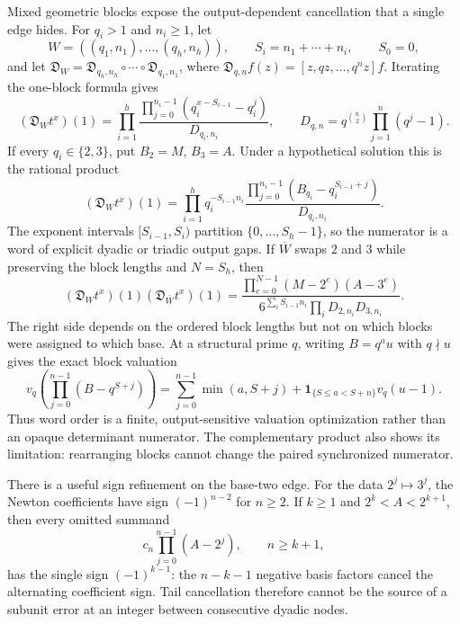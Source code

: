 \documentclass[11pt,oneside]{article}
\theoremstyle{definition}
\theoremstyle{remark}
\begin{document}
Mixed geometric blocks expose the output-dependent cancellation that a single edge hides.
For $q_i>1$ and $n_i\ge1$, let
\[
 W=((q_1,n_1),\ldots,(q_h,n_h)),\qquad
 S_i=n_1+\cdots+n_i,\qquad S_0=0,
\]
and let $\mathfrak D_W=\mathfrak D_{q_h,n_h}\circ\cdots\circ\mathfrak D_{q_1,n_1}$, where
$\mathfrak D_{q,n}f(z)=[z,qz,\ldots,q^nz]f$.  Iterating the one-block formula gives
\begin{equation}
 (\mathfrak D_Wt^x)(1)=
 \prod_{i=1}^h
 \frac{\prod_{j=0}^{n_i-1}(q_i^{x-S_{i-1}}-q_i^j)}
      {D_{q_i,n_i}},
 \qquad
 D_{q,n}=q^{\binom n2}\prod_{j=1}^n(q^j-1).
 \label{arithinterp:eq-mixed-word}
\end{equation}
If every $q_i\in\{2,3\}$, put $B_2=M$, $B_3=A$.  Under a hypothetical solution this is
the rational product
\begin{equation}
 (\mathfrak D_Wt^x)(1)=
 \prod_{i=1}^h q_i^{-S_{i-1}n_i}
 \frac{\prod_{j=0}^{n_i-1}(B_{q_i}-q_i^{S_{i-1}+j})}{D_{q_i,n_i}}.
 \label{arithinterp:eq-mixed-word-output}
\end{equation}
The exponent intervals $[S_{i-1},S_i)$ partition $\{0,\ldots,S_h-1\}$, so the numerator
is a word of explicit dyadic or triadic output gaps.  If $\overline W$ swaps $2$ and $3$
while preserving the block lengths and $N=S_h$, then
\begin{equation}
 (\mathfrak D_Wt^x)(1)(\mathfrak D_{\overline W}t^x)(1)=
 \frac{\prod_{e=0}^{N-1}(M-2^e)(A-3^e)}
 {6^{\sum_iS_{i-1}n_i}\prod_iD_{2,n_i}D_{3,n_i}}.
 \label{arithinterp:eq-complementary-word}
\end{equation}
The right side depends on the ordered block lengths but not on which blocks were assigned to
which base.  At a structural prime $q$, writing $B=q^au$ with $q\nmid u$ gives the exact
block valuation
\begin{equation}
 v_q\!\left(\prod_{j=0}^{n-1}(B-q^{S+j})\right)
 =\sum_{j=0}^{n-1}\min(a,S+j)
 +\mathbf1_{\{S\le a<S+n\}}v_q(u-1).
 \label{arithinterp:eq-shifted-block-valuation}
\end{equation}
Thus word order is a finite, output-sensitive valuation optimization rather than an opaque
determinant numerator.  The complementary product also shows its limitation: rearranging
blocks cannot change the paired synchronized numerator.

There is a useful sign refinement on the base-two edge.  For the data $2^j\mapsto3^j$,
the Newton coefficients have sign $(-1)^{n-2}$ for $n\ge2$.  If $k\ge1$ and
$2^k<A<2^{k+1}$, then every omitted summand
\begin{equation}
 c_n\prod_{j=0}^{n-1}(A-2^j),\qquad n\ge k+1,
 \label{arithinterp:eq-one-signed-tail}
\end{equation}
has the single sign $(-1)^{k-1}$: the $n-k-1$ negative basis factors cancel the alternating
coefficient sign.  Tail cancellation therefore cannot be the source of a subunit error at
an integer between consecutive dyadic nodes.
\end{document}
